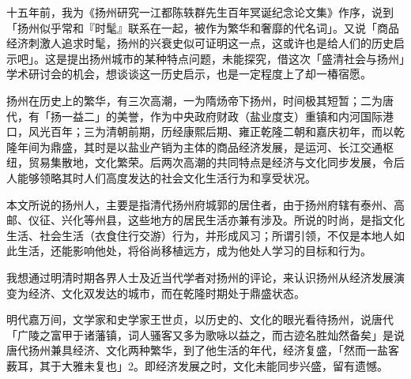 十五年前，我为《扬州研究一江都陈轶群先生百年冥诞纪念论文集》作序，说到「扬州似乎常和『时髦』联系在一起，被作为繁华和奢靡的代名词」。又说「商品经济刺激人追求时髦，扬州的兴衰史似可证明这一点，这或许也是给人们的历史启示吧」。这是提出扬州城市的某种特点问题，未能探究，借这次「盛清社会与扬州」学术研讨会的机会，想谈谈这一历史启示，也是一定程度上了却一椿宿愿。

扬州在历史上的繁华，有三次高潮，一为隋炀帝下扬州，时间极其短暂；二为唐代，有「扬一益二」的美誉，作为中央政府财政（盐业度支）重镇和内河国际港口，风光百年；三为清朝前期，历经康熙后期、雍正乾隆二朝和嘉庆初年，而以乾隆年间为鼎盛，其时是以盐业产销为主体的商品经济发展，是运河、长江交通枢纽，贸易集散地，文化繁荣。后两次高潮的共同特点是经济与文化同步发展，令后人能够领略其时人们高度发达的社会文化生活行为和享受状况。

本文所说的扬州人，主要是指清代扬州府城郭的居住者，由于扬州府辖有泰州、高邮、仪征、兴化等州县，这些地方的居民生活亦兼有涉及。所说的时尚，是指文化生活、社会生活（衣食住行交游）行为，并形成风习；所谓引领，不仅是本地人如此生活，还能影响他处，将俗尚移植远方，成为他处人学习的目标和行为。


我想通过明清时期各界人士及近当代学者对扬州的评论，来认识扬州从经济发展演变为经济、文化双发达的城市，而在乾隆时期处于鼎盛状态。

\vfill
\begin{BookNotes}
\end{BookNotes}

明代嘉万间，文学家和史学家王世贞，以历史的、文化的眼光看待扬州，说唐代「广陵之富甲于诸藩镇，词人骚客又多为歌咏以益之，而古迹名胜灿然备矣」是说唐代扬州兼具经济、文化两种繁华，到了他生活的年代，经济复盛，「然而一盐客薮耳，其于大雅未复也」2。即经济发展之时，文化未能同步兴盛，留有遗憾。

